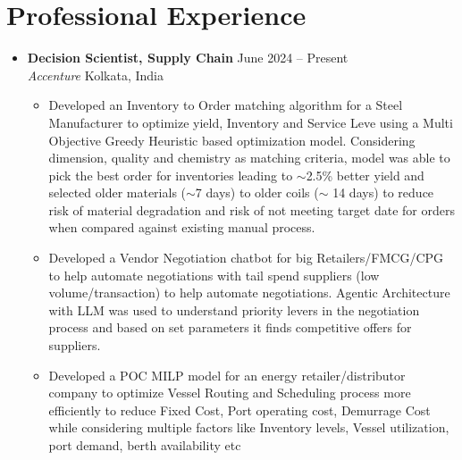 \documentclass[a4paper,10pt]{article}
\newcommand{\resumeItem}[1]{\item\small{#1}}
\newcommand{\resumeSubheading}[4]{
  \vspace{1pt}\item
    \textbf{#1} \hfill {#2} \\
    \emph{#3} \hfill {#4} \\
}
\begin{document}
\section*{Professional Experience}
\begin{itemize}
    \resumeSubheading
      {Decision Scientist, Supply Chain}{June 2024 -- Present}
      {Accenture}{Kolkata, India}
      \begin{itemize}
          \resumeItem{
            Developed an Inventory to Order matching algorithm for a Steel Manufacturer to optimize yield, 
            Inventory and Service Leve using a Multi Objective Greedy Heuristic based optimization model. 
            Considering dimension, quality and chemistry as matching criteria, model was able to pick the 
            best order for inventories leading to $\sim$2.5\% better yield and selected older materials ($\sim$7 days) 
            to older coils ($\sim$ 14 days) to reduce risk of material degradation and risk of not meeting target 
            date for orders when compared against existing manual process.
            }
          \resumeItem{
            Developed a Vendor Negotiation chatbot for big Retailers/FMCG/CPG to help automate negotiations with tail
            spend suppliers (low volume/transaction) to help automate negotiations. Agentic Architecture with LLM was used to understand priority levers in
            the negotiation process and based on set parameters it finds competitive offers for suppliers.
          }
          \resumeItem{
            Developed a POC MILP model for an energy retailer/distributor company to optimize Vessel Routing and
            Scheduling process more efficiently to reduce Fixed Cost, Port operating cost, Demurrage Cost while
            considering multiple factors like Inventory levels, Vessel utilization, port demand, berth availability etc
          }
      \end{itemize}


\end{itemize}
\end{document}
